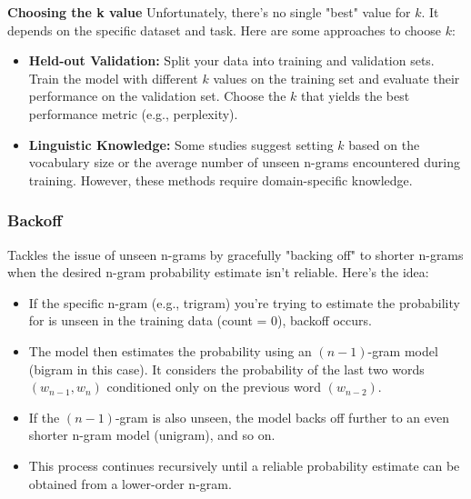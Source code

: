\documentclass[12pt]{article}
\begin{document}
            \textbf{Choosing the k value}
            Unfortunately, there's no single "best" value for $k$. It depends on the specific dataset and task. Here are some approaches to choose $k$:
            \begin{itemize}
                \item \textbf{Held-out Validation:} Split your data into training and validation sets. Train the model with different $k$ values on the training set and evaluate their performance on the validation set. Choose the $k$ that yields the best performance metric (e.g., perplexity).
                \item \textbf{Linguistic Knowledge:} Some studies suggest setting $k$ based on the vocabulary size or the average number of unseen n-grams encountered during training. However, these methods require domain-specific knowledge.
            \end{itemize}

        \subsubsection{Backoff}
            Tackles the issue of unseen n-grams by gracefully "backing off" to shorter n-grams when the desired n-gram probability estimate isn't reliable. Here's the idea:
            \begin{itemize}
                \item If the specific n-gram (e.g., trigram) you're trying to estimate the probability for is unseen in the training data (count = 0), backoff occurs.
                \item The model then estimates the probability using an $(n-1)$-gram model (bigram in this case). It considers the probability of the last two words $(w_{n-1}, w_n)$ conditioned only on the previous word $(w_{n-2})$.
                \item If the $(n-1)$-gram is also unseen, the model backs off further to an even shorter n-gram model (unigram), and so on.
                \item This process continues recursively until a reliable probability estimate can be obtained from a lower-order n-gram.
            \end{itemize}
        
\end{document}
